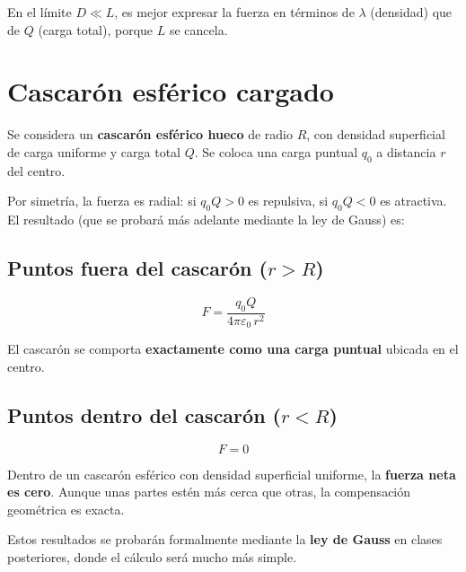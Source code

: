\documentclass[12pt,a4paper]{article}
\begin{document}
\begin{warnbox}[Atención]
  En el límite $D \ll L$, es mejor expresar la fuerza en términos de
  $\lambda$ (densidad) que de $Q$ (carga total), porque $L$ se cancela.
\end{warnbox}

\section{Cascarón esférico cargado}

Se considera un \textbf{cascarón esférico hueco} de radio $R$, con
densidad superficial de carga uniforme y carga total $Q$. Se coloca una
carga puntual $q_0$ a distancia $r$ del centro.

Por simetría, la fuerza es radial: si $q_0 Q > 0$ es repulsiva, si
$q_0 Q < 0$ es atractiva. El resultado (que se probará más adelante
mediante la ley de Gauss) es:

\subsection{Puntos fuera del cascarón ($r > R$)}

\[
F = \frac{q_0 Q}{4\pi\varepsilon_0 \, r^{2}}
\]

El cascarón se comporta \textbf{exactamente como una carga puntual}
ubicada en el centro.

\subsection{Puntos dentro del cascarón ($r < R$)}

\[
F = 0
\]

\begin{keybox}
  Dentro de un cascarón esférico con densidad superficial uniforme, la
  \textbf{fuerza neta es cero}. Aunque unas partes estén más cerca que
  otras, la compensación geométrica es exacta.
\end{keybox}

\begin{notebox}
  Estos resultados se probarán formalmente mediante la \textbf{ley de
  Gauss} en clases posteriores, donde el cálculo será mucho más simple.
\end{notebox}

\end{document}
